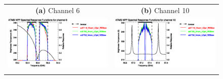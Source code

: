 \begin{figure}[htp]
  \centering
  \begin{tabular}{c c}
    \textsf{\textbf{(a)} Channel 6} &
    \textsf{\textbf{(b)} Channel 10} \\
    \includegraphics[bb=70 400 300 559,clip,scale=1.0]{graphics/srf/Tset/atms_npp.ch6.osrf.eps} &
    \includegraphics[bb=70 400 300 559,clip,scale=1.0]{graphics/srf/Tset/atms_npp.ch10.osrf.eps} \\\\


\end{tabular}
\end{figure}
